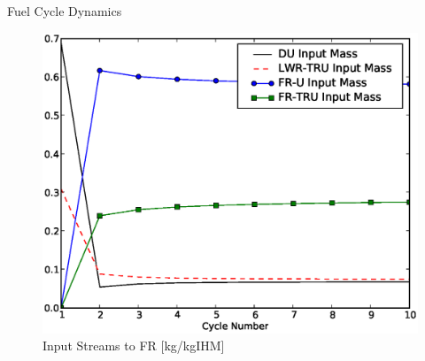 \documentclass[pdf, autumn, slideColor, nocolorBG]{prosper}
\begin{document}
\begin{slide}{Fuel Cycle Dynamics}
\begin{center}
\begin{figure}
\caption{Input Streams to FR [kg/kgIHM]}
\includegraphics[scale=0.4]{../se_sensitivity/figs/MassStreams.eps}
\end{figure}
\end{center}
\end{slide}
\end{document}
